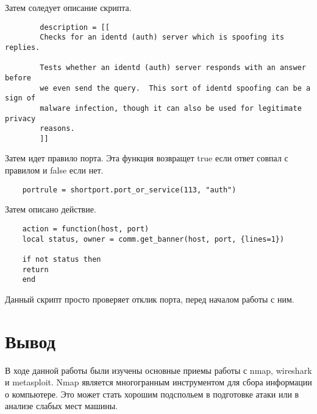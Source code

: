 \documentclass{article}
\begin{document}
  Затем соледует описание скрипта.
  \begin{verbatim}
  		description = [[
  		Checks for an identd (auth) server which is spoofing its replies.
  		
  		Tests whether an identd (auth) server responds with an answer before
  		we even send the query.  This sort of identd spoofing can be a sign of
  		malware infection, though it can also be used for legitimate privacy
  		reasons.
  		]]
  \end{verbatim}
  
  Затем идет правило порта. Эта функция возвращет true если ответ совпал с правилом и false если нет.
  \begin{verbatim}
  	portrule = shortport.port_or_service(113, "auth")
  \end{verbatim}
  
  Затем описано действие.
  \begin{verbatim}
  	action = function(host, port)
  	local status, owner = comm.get_banner(host, port, {lines=1})
  	
  	if not status then
  	return
  	end
  \end{verbatim}
  
  Данный скрипт просто проверяет отклик порта, перед началом работы с ним.
  
  \section{Вывод}
  В ходе данной работы были изучены основные приемы работы с nmap, wireshark и metasploit. Nmap является многогранным инструментом для сбора информации о компьютере. Это может стать хорошим подспольем в подготовке атаки или в анализе слабых мест машины.
 
\end{document}
